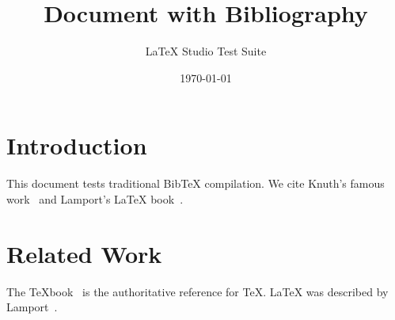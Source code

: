 \documentclass{article}
\title{Document with Bibliography}
\author{LaTeX Studio Test Suite}
\date{\today}
\begin{document}
\maketitle

\section{Introduction}
This document tests traditional BibTeX compilation.
We cite Knuth's famous work~\cite{knuth1984} and Lamport's LaTeX book~\cite{lamport1994}.

\section{Related Work}
The TeXbook~\cite{knuth1984} is the authoritative reference for TeX.
LaTeX was described by Lamport~\cite{lamport1994}.



\end{document}
